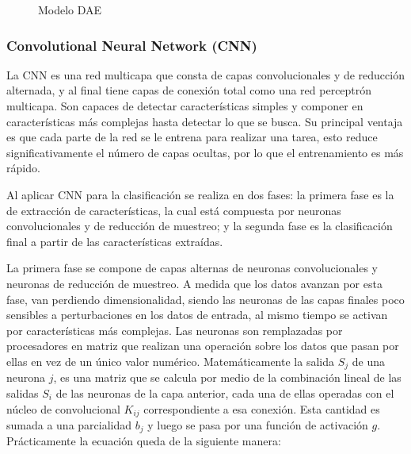 \begin{figure}[h!]
\caption{Modelo DAE}
\end{figure}

\subsubsection{Convolutional Neural Network (CNN)}

  La CNN es una red multicapa que consta de capas convolucionales y de reducci\'{o}n alternada, y al final tiene capas de conexi\'{o}n total como una red perceptr\'{o}n multicapa. Son capaces de detectar caracter\'{i}sticas simples y componer en caracter\'{i}sticas m\'{a}s complejas hasta detectar lo que se busca. Su principal ventaja es que cada parte de la red se le entrena para realizar una tarea, esto reduce significativamente el n\'{u}mero de capas ocultas, por lo que el entrenamiento es m\'{a}s r\'{a}pido.
  
  Al aplicar CNN para la clasificaci\'{o}n se realiza en dos fases: la primera fase es la de extracci\'{o}n de caracter\'{i}sticas, la cual est\'{a} compuesta por neuronas convolucionales y de reducci\'{o}n de muestreo; y la segunda fase es la clasificaci\'{o}n final a partir de las caracter\'{i}sticas extra\'{i}das.
  
  La primera fase se compone de capas alternas de neuronas convolucionales y neuronas de reducci\'{o}n de muestreo. A medida que los datos avanzan por esta fase, van perdiendo dimensionalidad, siendo las neuronas de las capas finales poco sensibles a perturbaciones en los datos de entrada, al mismo tiempo se activan por caracter\'{i}sticas m\'{a}s complejas. Las neuronas son remplazadas por procesadores en matriz que realizan una operaci\'{o}n sobre los datos que pasan por ellas en vez de un \'{u}nico valor num\'{e}rico. Matem\'{a}ticamente la salida $S_{j}$ de una neurona $j$, es una matriz que se calcula por medio de la combinaci\'{o}n lineal de las salidas $S_{i}$ de las neuronas de la capa anterior, cada una de ellas operadas con el n\'{u}cleo de convolucional $K_{ij}$ correspondiente a esa conexi\'{o}n. Esta cantidad es sumada a una parcialidad $b_{j}$ y luego se pasa por una funci\'{o}n de activaci\'{o}n $g$. Pr\'{a}cticamente la ecuaci\'{o}n queda de la siguiente manera:

